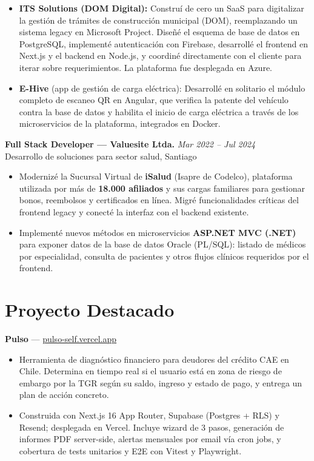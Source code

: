 \documentclass[10.5pt]{article}
\begin{document}
\begin{itemize}
  \item \textbf{ITS Solutions (DOM Digital):} Construí de cero un SaaS para digitalizar la gestión de trámites de construcción municipal (DOM), reemplazando un sistema legacy en Microsoft Project. Diseñé el esquema de base de datos en PostgreSQL, implementé autenticación con Firebase, desarrollé el frontend en Next.js y el backend en Node.js, y coordiné directamente con el cliente para iterar sobre requerimientos. La plataforma fue desplegada en Azure.
  \item \textbf{E-Hive} (app de gestión de carga eléctrica): Desarrollé en solitario el módulo completo de escaneo QR en Angular, que verifica la patente del vehículo contra la base de datos y habilita el inicio de carga eléctrica a través de los microservicios de la plataforma, integrados en Docker.
\end{itemize}

\vspace{4pt}

\textbf{Full Stack Developer --- Valuesite Ltda.} \hfill \textit{Mar 2022 -- Jul 2024}\\
{\small Desarrollo de soluciones para sector salud, Santiago}

\begin{itemize}
  \item Modernizé la Sucursal Virtual de \textbf{iSalud} (Isapre de Codelco), plataforma utilizada por más de \textbf{18.000 afiliados} y sus cargas familiares para gestionar bonos, reembolsos y certificados en línea. Migré funcionalidades críticas del frontend legacy y conecté la interfaz con el backend existente.
  \item Implementé nuevos métodos en microservicios \textbf{ASP.NET MVC (.NET)} para exponer datos de la base de datos Oracle (PL/SQL): listado de médicos por especialidad, consulta de pacientes y otros flujos clínicos requeridos por el frontend.
\end{itemize}

\vspace{4pt}

\section{Proyecto Destacado}

\textbf{Pulso} --- \href{https://pulso-self.vercel.app}{pulso-self.vercel.app}
\begin{itemize}
  \item Herramienta de diagnóstico financiero para deudores del crédito CAE en Chile. Determina en tiempo real si el usuario está en zona de riesgo de embargo por la TGR según su saldo, ingreso y estado de pago, y entrega un plan de acción concreto.
  \item Construida con Next.js 16 App Router, Supabase (Postgres + RLS) y Resend; desplegada en Vercel. Incluye wizard de 3 pasos, generación de informes PDF server-side, alertas mensuales por email vía cron jobs, y cobertura de tests unitarios y E2E con Vitest y Playwright.
\end{itemize}
\end{document}
